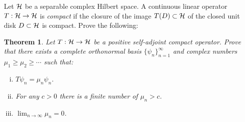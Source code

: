 \documentclass{pset}
\theoremstyle{plain}
\newtheorem*{regtheorem}{Theorem}
\begin{document}
\begin{problem}{4}
  Let $\mathcal{H}$ be a separable complex Hilbert space. A continuous linear operator $T : \mathcal{H} \to \mathcal{H}$ is \emph{compact} if the closure of the image $T(D)\subset \mathcal{H}$ of the closed unit disk $D\subset \mathcal{H}$ is compact. Prove the following:
  \begin{regtheorem}
    Let $T : \mathcal{H} \to \mathcal{H}$ be a positive self-adjoint compact operator. Prove that there exists a complete orthonormal basis $\{\psi_n\}^\infty_{n=1}$ and complex numbers $\mu_1 \geq \mu_2\geq\cdots$ such that:
    \begin{enumerate}[(i)]
      \item $T\psi_n = \mu_n \psi_n$.
      \item For any $c>0$ there is a finite number of $\mu_n > c$. 
      \item $\lim_{n\to \infty} \mu_n = 0$.
    \end{enumerate}
  \end{regtheorem}
\end{problem}
\end{document}
